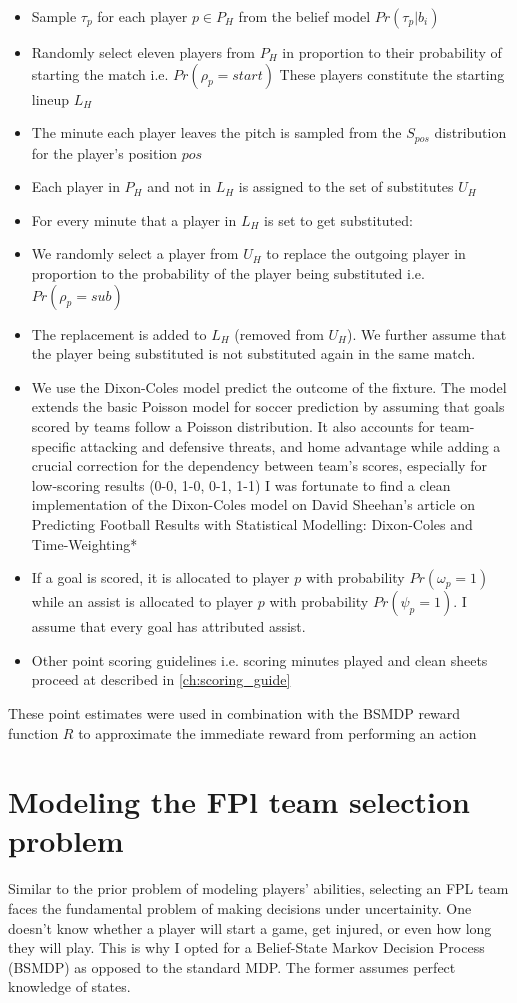 \begin{itemize}
    \item Sample $\tau_p$ for each player $p \in P_H$  from the belief model $Pr(\tau_p | b_i)$
    \item Randomly select eleven players from $P_H$ in proportion to their probability of starting the match i.e. $Pr(\rho_p = start)$ These players constitute the starting lineup $L_H$
    \item The minute each player leaves the pitch is sampled from the $S_{pos}$ distribution for the player's position $pos$
    \item Each player in $P_H$ and not in $L_H$ is assigned to the set of substitutes $U_H$
    \item For every minute that a player in $L_H$ is set to get substituted:
        \item We randomly select a player from $U_H$ to replace the outgoing player in proportion to the probability of the player being substituted i.e. $Pr(\rho_p = sub)$
        \item The replacement is added to $L_H$ (removed from $U_H$). We further assume that the player being substituted is not substituted again in the same match.
    \item We use the Dixon-Coles model \cite{dixon1997} predict the outcome of the fixture. The model extends the basic Poisson model for soccer prediction by assuming that goals scored by teams follow a Poisson distribution. It also accounts for team-specific attacking and defensive threats, and home advantage while adding a crucial correction for the dependency between team's scores, especially for low-scoring results (0-0, 1-0, 0-1, 1-1) I was fortunate to find a clean implementation of the Dixon-Coles model on David Sheehan's article on  Predicting Football Results with Statistical Modelling: Dixon-Coles and Time-Weighting* \cite{sheehan2018}
    \item If a goal is scored, it is allocated to player $p$ with probability $Pr(\omega_p = 1)$ while an assist is allocated to player $p$ with probability $Pr(\psi_p = 1)$. I assume that every goal has attributed assist.
    \item Other point scoring guidelines i.e. scoring minutes played and clean sheets proceed at described in \ref{ch:scoring_guide}
\end{itemize}
These point estimates were used in combination with the BSMDP reward function $R$ to approximate the immediate reward from performing an action

\section{Modeling the FPl team selection problem}
Similar to the prior problem of modeling players' abilities, selecting an FPL team faces the fundamental problem of making decisions under uncertainity. One doesn't know whether a player will start a game, get injured, or even how long they will play. This is why I opted for a Belief-State Markov Decision Process (BSMDP) as opposed to the standard MDP. The former assumes perfect knowledge of states.

